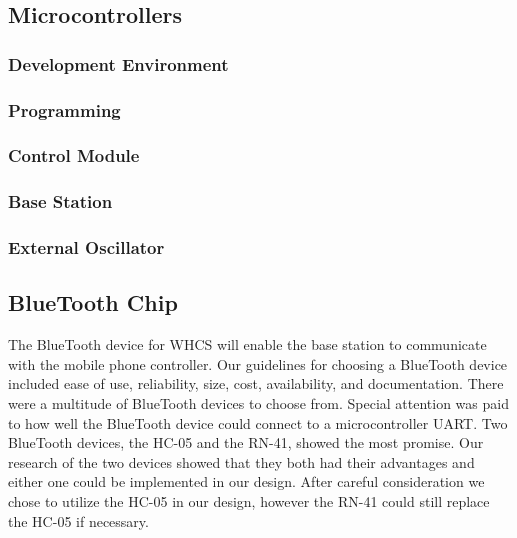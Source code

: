 \subsection{Microcontrollers}


\subsubsection{Development Environment}

\subsubsection{Programming}

\subsubsection{Control Module}

\subsubsection{Base Station}

\subsubsection{External Oscillator}

\subsection{BlueTooth Chip}
The BlueTooth device for WHCS will enable the base station to communicate with
the mobile phone controller. Our guidelines for choosing a BlueTooth device
included ease of use, reliability, size, cost, availability, and documentation.
There were a multitude of BlueTooth devices to choose from. Special attention
was paid to how well the BlueTooth device could connect to a microcontroller
UART. Two BlueTooth devices, the HC{}-05 and the RN{}-41, showed the most
promise. Our research of the two devices showed that they both had their
advantages and either one could be implemented in our design. After careful
consideration we chose to utilize the HC{}-05 in our design, however the
RN{}-41 could still replace the HC{}-05 if necessary.

